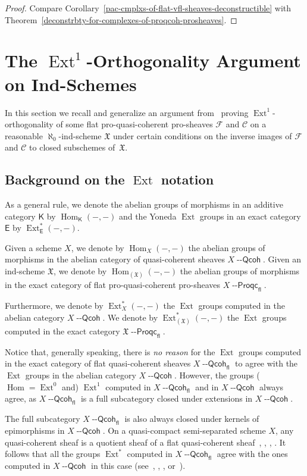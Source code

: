 \documentclass[12pt,a4paper]{amsart}
\newcommand{\+}{\protect\nobreakdash-}
\renewcommand{\:}{\colon}
\DeclareMathOperator{\Hom}{Hom}
\DeclareMathOperator{\Ext}{Ext}
\newcommand{\Qcoh}{{\operatorname{\mathsf{--Qcoh}}}}
\newcommand{\Proqc}{{\operatorname{\mathsf{--Proqc}}}}
\newcommand{\fl}{\mathsf{fl}}
\newcommand{\sE}{\mathsf E}
\newcommand{\sK}{\mathsf K}
\newcommand{\fX}{\mathfrak X}
\newcommand{\rC}{\mathscr C}
\newcommand{\rF}{\mathscr F}
\newcommand{\Section}[1]{\bigskip\section{#1}\medskip}
\theoremstyle{plain}
\theoremstyle{definition}
\begin{document}
\begin{proof}
 Compare
Corollary~\ref{pac-cmplxs-of-flat-vfl-sheaves-deconstructible}
with Theorem~\ref{deconstrbty-for-complexes-of-proqcoh-prosheaves}.
\end{proof}


\Section{The $\Ext^1$-Orthogonality Argument on Ind-Schemes}
\label{orthogonality-secn}

 In this section we recall and generalize an argument
from~\cite[Section~8.5]{Pform} proving $\Ext^1$\+orthogonality of
some flat pro-quasi-coherent pro-sheaves $\rF$ and $\rC$ on
a reasonable $\aleph_0$\+ind-scheme $\fX$ under certain conditions on
the inverse images of $\rF$ and $\rC$ to closed subschemes of~$\fX$.

\subsection{Background on the $\Ext$ notation}
 As a general rule, we denote the abelian groups of morphisms in
an additive category $\sK$ by $\Hom_\sK({-},{-})$ and the Yoneda
$\Ext$ groups in an exact category $\sE$ by $\Ext^*_\sE({-},{-})$.

 Given a scheme $X$, we denote by $\Hom_X({-},{-})$ the abelian
groups of morphisms in the abelian category of quasi-coherent
sheaves $X\Qcoh$.
 Given an ind-scheme $\fX$, we denote by $\Hom_{(\fX)}({-},{-})$
the abelian groups of morphisms in the exact category of flat
pro-quasi-coherent pro-sheaves $X\Proqc_\fl$.
 
 Furthermore, we denote by $\Ext^*_X({-},{-})$ the $\Ext$ groups
computed in the abelian category $X\Qcoh$.
 We denote by $\Ext^*_{(\fX)}({-},{-})$ the $\Ext$ groups computed
in the exact category $\fX\Proqc_\fl$.

 Notice that, generally speaking, there is \emph{no reason} for
the $\Ext$ groups computed in the exact category of flat
quasi-coherent sheaves $X\Qcoh_\fl$ to agree with the $\Ext$ groups
in the abelian category $X\Qcoh$.
 However, the groups ($\Hom=\Ext^0$ and) $\Ext^1$ computed in
$X\Qcoh_\fl$ and in $X\Qcoh$ always agree, as $X\Qcoh_\fl$ is
a full subcategory closed under extensions in $X\Qcoh$.

 The full subcategory $X\Qcoh_\fl$ is also always closed under
kernels of epimorphisms in $X\Qcoh$.
 On a quasi-compact semi-separated scheme $X$, any quasi-coherent
sheaf is a quotient sheaf of a flat quasi-coherent
sheaf~\cite[Section~2.4]{M-n}, \cite[Section~3.2]{M-th},
\cite[Lemma~A.1]{EP}, \cite[Lemma~4.1.1 or~4.1.8]{Pcosh}.
 It follows that all the groups $\Ext^*$ computed in $X\Qcoh_\fl$
agree with the ones computed in $X\Qcoh$ in this
case (see~\cite[Theorem~12.1(b)]{Kel}, \cite[Proposition~13.2.2(i)]{KS},
\cite[Proposition~A.2.1 or~A.3.1(a)]{Pcosh},
or~\cite[Lemma~6.3]{Pfltp}).
\end{document}
